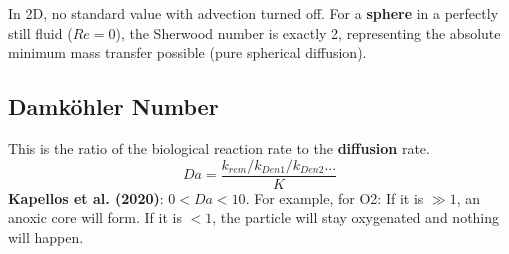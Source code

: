 \documentclass{article}
\begin{document}
In 2D, no standard value with advection turned off. For a \textbf{sphere} in a perfectly still fluid ($Re=0$), the Sherwood number is exactly 2, representing the absolute minimum mass transfer possible (pure spherical diffusion).


\subsection{Damköhler Number}
This is the ratio of the biological reaction rate to the \textbf{diffusion} rate.
\begin{equation}
    Da = \frac{k_{rem}/k_{Den1}/k_{Den2}...}{K}
\end{equation}
\textbf{Kapellos et al. (2020)}: $0<Da<10$. For example, for O2: If it is $\gg 1$, an anoxic core will form. If it is $< 1$, the particle will stay oxygenated and nothing will happen.
\end{document}
